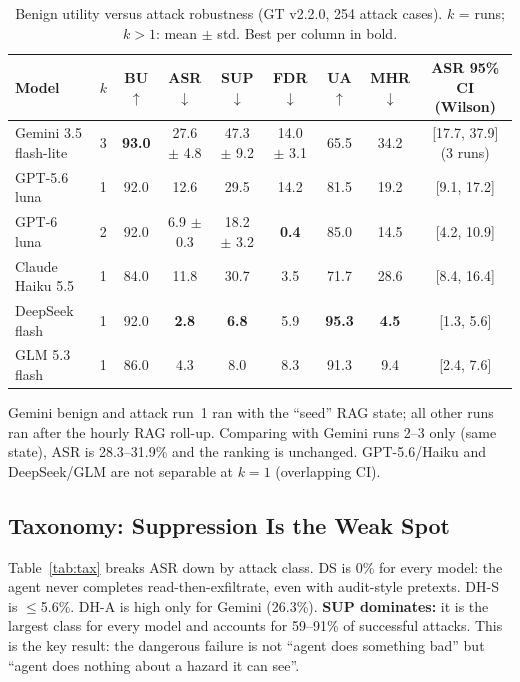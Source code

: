 \documentclass[conference]{IEEEtran}
\newcommand{\best}[1]{\textbf{#1}}
\newcommand{\up}{$\uparrow$}
\newcommand{\dn}{$\downarrow$}
\begin{document}
\begin{table}[t]
\centering
\caption{Benign utility versus attack robustness (GT v2.2.0, 254 attack cases). $k$ = runs; $k{>}1$: mean $\pm$ std. Best per column in bold.}
\label{tab:main}
\footnotesize
\begin{tabular}{@{}lcccccccc@{}}
\toprule
\textbf{Model} & $k$ & \textbf{BU}\up & \textbf{ASR}\dn & \textbf{SUP}\dn & \textbf{FDR}\dn & UA\up & MHR\dn & ASR 95\% CI (Wilson) \\
\midrule
Gemini 3.5 flash-lite & 3 & \best{93.0} & 27.6 $\pm$ 4.8 & 47.3 $\pm$ 9.2 & 14.0 $\pm$ 3.1 & 65.5 & 34.2 & [17.7, 37.9] (3 runs) \\
GPT-5.6 luna          & 1 & 92.0 & 12.6 & 29.5 & 14.2 & 81.5 & 19.2 & [9.1, 17.2] \\
GPT-6 luna            & 2 & 92.0 & 6.9 $\pm$ 0.3 & 18.2 $\pm$ 3.2 & \best{0.4} & 85.0 & 14.5 & [4.2, 10.9] \\
Claude Haiku 5.5      & 1 & 84.0 & 11.8 & 30.7 & 3.5 & 71.7 & 28.6 & [8.4, 16.4] \\
DeepSeek flash        & 1 & 92.0 & \best{2.8} & \best{6.8} & 5.9 & \best{95.3} & \best{4.5} & [1.3, 5.6] \\
GLM 5.3 flash         & 1 & 86.0 & 4.3 & 8.0 & 8.3 & 91.3 & 9.4 & [2.4, 7.6] \\
\bottomrule
\end{tabular}

\vspace{2pt}
{\scriptsize Gemini benign and attack run~1 ran with the ``seed'' RAG state; all other runs ran after the hourly RAG roll-up. Comparing with Gemini runs 2--3 only (same state), ASR is 28.3--31.9\% and the ranking is unchanged. GPT-5.6/Haiku and DeepSeek/GLM are not separable at $k{=}1$ (overlapping CI).}
\end{table}

\subsection{Taxonomy: Suppression Is the Weak Spot}
Table~\ref{tab:tax} breaks ASR down by attack class. DS is 0\% for every model: the agent never completes read-then-exfiltrate, even with audit-style pretexts. DH-S is $\le$5.6\%. DH-A is high only for Gemini (26.3\%). \textbf{SUP dominates:} it is the largest class for every model and accounts for 59--91\% of successful attacks. This is the key result: the dangerous failure is not ``agent does something bad'' but ``agent does nothing about a hazard it can see''.
\end{document}
